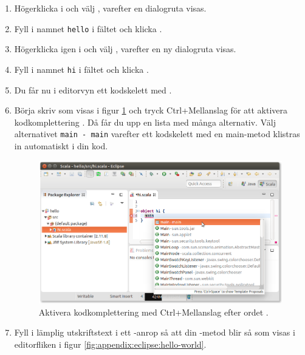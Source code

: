 \begin{enumerate}
\item Högerklicka i  och välj , varefter en dialogruta visas.

\item Fyll i namnet \texttt{hello} i fältet  och klicka .

\item Högerklicka igen i  och välj , varefter en ny dialogruta visas.

\item Fyll i namnet \texttt{hi} i fältet  och klicka .

\item Du får nu i editorvyn ett kodskelett med .

\item Börja skriv  som visas i figur \ref{fig:appendix:eclipse:complete-main} och tryck Ctrl+Mellanslag för att aktivera kodkomplettering . Då får du upp en lista med många alternativ. Välj alternativet \texttt{main - main} varefter ett kodskelett med en main-metod klistras in automatiskt i din kod.

\begin{figure}
\centering
\includegraphics[width=1.0\textwidth]{../img/eclipse/eclipse-complete-main.png}
\caption{Aktivera kodkomplettering med Ctrl+Mellanslag efter ordet .}
\label{fig:appendix:eclipse:complete-main}
\end{figure}

\item Fyll i lämplig utskriftstext i ett -anrop så att din -metod blir så som visas i editorfliken i figur \ref{fig:appendix:eclipse:hello-world}.


\end{enumerate}

